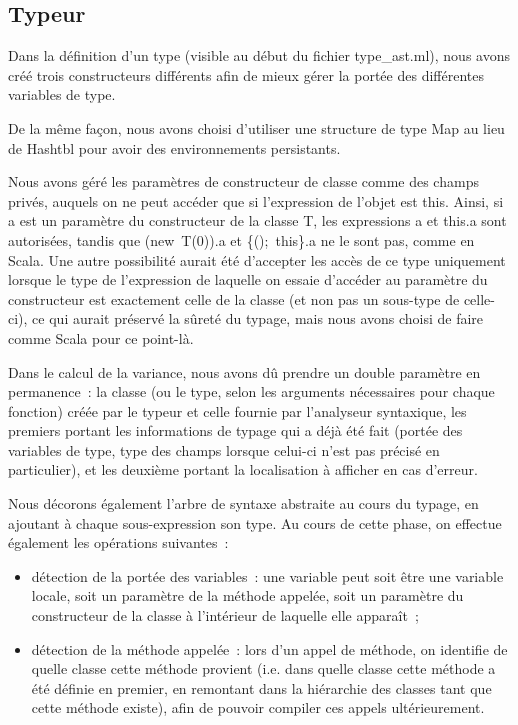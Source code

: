 \documentclass[a4paper,10pt]{article}
\newcommand{\code}[1]{{\fontfamily{pcr}\selectfont #1}}
\begin{document}
\subsection{Typeur}

Dans la définition d'un type (visible au début du fichier
\code{type\_{}ast.ml}), nous avons créé trois constructeurs différents
afin de mieux gérer la portée des différentes variables de type.

De la même façon, nous avons choisi d'utiliser une structure de type
\code{Map} au lieu de \code{Hashtbl} pour avoir des environnements
persistants.

Nous avons géré les paramètres de constructeur de classe comme des
champs privés, auquels on ne peut accéder que si l'expression de
l'objet est \code{this}. Ainsi, si \code{a} est un paramètre du
constructeur de la classe T, les expressions \code{a} et \code{this.a}
sont autorisées, tandis que \code{(new~T(0)).a} et
\code{\{();~this\}.a} ne le sont pas, comme en Scala. Une autre
possibilité aurait été d'accepter les accès de ce type uniquement
lorsque le type de l'expression de laquelle on essaie d'accéder au
paramètre du constructeur est exactement celle de la classe (et non
pas un sous-type de celle-ci), ce qui aurait préservé la sûreté du
typage, mais nous avons choisi de faire comme Scala pour ce point-là.

Dans le calcul de la variance, nous avons dû prendre un double
paramètre en permanence~: la classe (ou le type, selon les arguments
nécessaires pour chaque fonction) créée par le typeur et celle fournie
par l'analyseur syntaxique, les premiers portant les informations de
typage qui a déjà été fait (portée des variables de type, type des
champs lorsque celui-ci n'est pas précisé en particulier), et les
deuxième portant la localisation à afficher en cas d'erreur.

Nous décorons également l'arbre de syntaxe abstraite au cours du
typage, en ajoutant à chaque sous-expression son type. Au cours de
cette phase, on effectue également les opérations suivantes~:
\begin{itemize}
\item{détection de la portée des variables~: une variable peut soit
    être une variable locale, soit un paramètre de la méthode appelée,
  soit un paramètre du constructeur de la classe à l'intérieur de
  laquelle elle apparaît~;}
\item{détection de la méthode appelée~: lors d'un appel de méthode, on
    identifie de quelle classe cette méthode provient (i.e. dans
    quelle classe cette méthode a été définie en premier, en remontant
    dans la hiérarchie des classes tant que cette méthode existe),
    afin de pouvoir compiler ces appels ultérieurement.}
\end{itemize}
\end{document}
